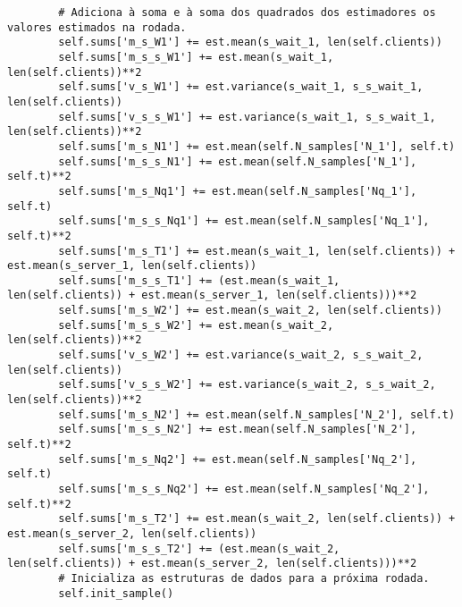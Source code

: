 \begin{verbatim}
        # Adiciona à soma e à soma dos quadrados dos estimadores os valores estimados na rodada.
        self.sums['m_s_W1'] += est.mean(s_wait_1, len(self.clients))
        self.sums['m_s_s_W1'] += est.mean(s_wait_1, len(self.clients))**2
        self.sums['v_s_W1'] += est.variance(s_wait_1, s_s_wait_1, len(self.clients))
        self.sums['v_s_s_W1'] += est.variance(s_wait_1, s_s_wait_1, len(self.clients))**2
        self.sums['m_s_N1'] += est.mean(self.N_samples['N_1'], self.t)
        self.sums['m_s_s_N1'] += est.mean(self.N_samples['N_1'], self.t)**2
        self.sums['m_s_Nq1'] += est.mean(self.N_samples['Nq_1'], self.t)
        self.sums['m_s_s_Nq1'] += est.mean(self.N_samples['Nq_1'], self.t)**2
        self.sums['m_s_T1'] += est.mean(s_wait_1, len(self.clients)) + est.mean(s_server_1, len(self.clients))
        self.sums['m_s_s_T1'] += (est.mean(s_wait_1, len(self.clients)) + est.mean(s_server_1, len(self.clients)))**2
        self.sums['m_s_W2'] += est.mean(s_wait_2, len(self.clients))
        self.sums['m_s_s_W2'] += est.mean(s_wait_2, len(self.clients))**2
        self.sums['v_s_W2'] += est.variance(s_wait_2, s_s_wait_2, len(self.clients))
        self.sums['v_s_s_W2'] += est.variance(s_wait_2, s_s_wait_2, len(self.clients))**2
        self.sums['m_s_N2'] += est.mean(self.N_samples['N_2'], self.t)
        self.sums['m_s_s_N2'] += est.mean(self.N_samples['N_2'], self.t)**2
        self.sums['m_s_Nq2'] += est.mean(self.N_samples['Nq_2'], self.t)
        self.sums['m_s_s_Nq2'] += est.mean(self.N_samples['Nq_2'], self.t)**2
        self.sums['m_s_T2'] += est.mean(s_wait_2, len(self.clients)) + est.mean(s_server_2, len(self.clients))
        self.sums['m_s_s_T2'] += (est.mean(s_wait_2, len(self.clients)) + est.mean(s_server_2, len(self.clients)))**2
        # Inicializa as estruturas de dados para a próxima rodada.
        self.init_sample()
    

\end{verbatim}
